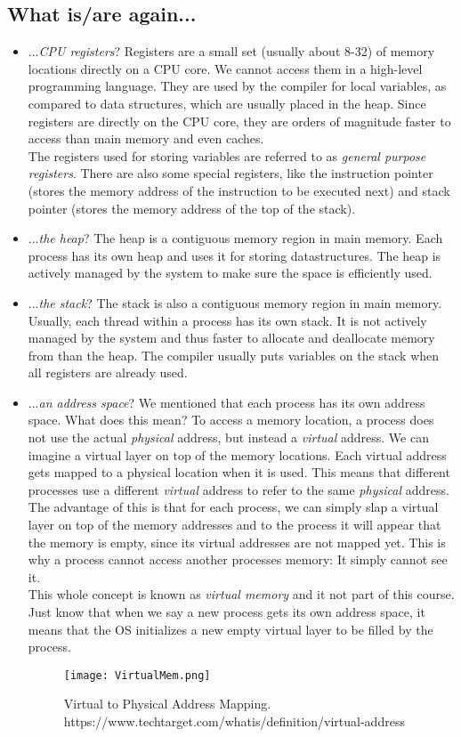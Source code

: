 \documentclass[main]{subfiles}
\begin{document}
\subsection{What is/are again...}
\begin{itemize}
  \item ...\textit{CPU registers}? Registers are a small set (usually about 8-32) of memory locations directly on a CPU core. We cannot access them in a high-level programming language. They are used by the compiler for local variables, as compared to data structures, which are usually placed in the heap. Since registers are directly on the CPU core, they are orders of magnitude faster to access than main memory and even caches.\\
  The registers used for storing variables are referred to as \textit{general purpose registers}. There are also some special registers, like the instruction pointer (stores the memory address of the instruction to be executed next) and stack pointer (stores the memory address of the top of the stack).
  \item ...\textit{the heap}? The heap is a contiguous memory region in main memory. Each process has its own heap and uses it for storing datastructures. The heap is actively managed by the system to make sure the space is efficiently used.
  \item ...\textit{the stack}? The stack is also a contiguous memory region in main memory. Usually, each thread within a process has its own stack. It is not actively managed by the system and thus faster to allocate and deallocate memory from than the heap. The compiler usually puts variables on the stack when all registers are already used.
  \item ...\textit{an address space}? We mentioned that each process has its own address space. What does this mean? To access a memory location, a process does not use the actual \textit{physical} address, but instead a \textit{virtual} address. We can imagine a virtual layer on top of the memory locations. Each virtual address gets mapped to a physical location when it is used. This means that different processes use a different \textit{virtual} address to refer to the same \textit{physical} address. The advantage of this is that for each process, we can simply slap a virtual layer on top of the memory addresses and to the process it will appear that the memory is empty, since its virtual addresses are not mapped yet. This is why a process cannot access another processes memory: It simply cannot see it.\\
  This whole concept is known as \textit{virtual memory} and it not part of this course. Just know that when we say a new process gets its own address space, it means that the OS initializes a new empty virtual layer to be filled by the process.
    \begin{figure}[H]
        \centering
        \texttt{[image: VirtualMem.png]}
        \caption{Virtual to Physical Address Mapping. https://www.techtarget.com/whatis/definition/virtual-address}
    \end{figure}

\end{itemize}
\end{document}
